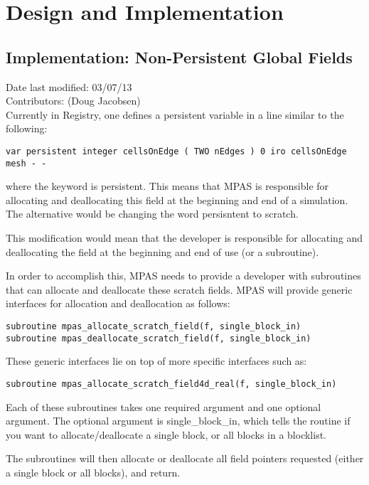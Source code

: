 \documentclass[11pt]{report}
\begin{document}
\chapter{Design and Implementation}

\section{Implementation: Non-Persistent Global Fields}
Date last modified: 03/07/13 \\
Contributors: (Doug Jacobsen) \\

Currently in Registry, one defines a persistent variable in a line similar to the following:
\begin{lstlisting}
var persistent integer cellsOnEdge ( TWO nEdges ) 0 iro cellsOnEdge mesh - -
\end{lstlisting}

where the keyword is persistent. This means that MPAS is responsible for
allocating and deallocating this field at the beginning and end of a
simulation. The alternative would be changing the word persisntent to scratch.

This modification would mean that the developer is responsible for allocating
and deallocating the field at the beginning and end of use (or a subroutine). 

In order to accomplish this, MPAS needs to provide a developer with subroutines
that can allocate and deallocate these scratch fields. MPAS will provide
generic interfaces for allocation and deallocation as follows:

\begin{lstlisting}
subroutine mpas_allocate_scratch_field(f, single_block_in)
subroutine mpas_deallocate_scratch_field(f, single_block_in)
\end{lstlisting}

These generic interfaces lie on top of more specific interfaces such as:

\begin{lstlisting}
subroutine mpas_allocate_scratch_field4d_real(f, single_block_in)
\end{lstlisting}

Each of these subroutines takes one required argument and one optional
argument. The optional argument is single\_block\_in, which tells the routine
if you want to allocate/deallocate a single block, or all blocks in a
blocklist.

The subroutines will then allocate or deallocate all field pointers requested
(either a single block or all blocks), and return.
\end{document}
